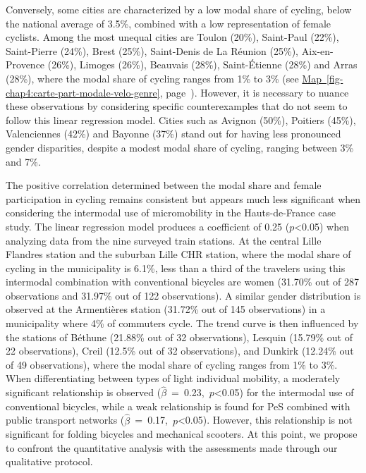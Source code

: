 \begin{refsegment}
Conversely, some cities are characterized by a low modal share of cycling, below the national average of 3.5\%, combined with a low representation of female cyclists. Among the most unequal cities are Toulon (20\%), Saint-Paul (22\%), Saint-Pierre (24\%), Brest (25\%), Saint-Denis de La Réunion (25\%), Aix-en-Provence (26\%), Limoges (26\%), Beauvais (28\%), Saint-Étienne (28\%) and Arras (28\%), where the modal share of cycling ranges from 1\% to 3\% (see \hyperref[fig-chap4:carte-part-modale-velo-genre]{Map~\ref{fig-chap4:carte-part-modale-velo-genre}}, page~\pageref{fig-chap4:carte-part-modale-velo-genre}). However, it is necessary to nuance these observations by considering specific counterexamples that do not seem to follow this linear regression model. Cities such as Avignon (50\%), Poitiers (45\%), Valenciennes (42\%) and Bayonne (37\%) stand out for having less pronounced gender disparities, despite a modest modal share of cycling, ranging between 3\% and 7\%. %

The positive correlation determined between the modal share and female participation in cycling remains consistent but appears much less significant when considering the intermodal use of micromobility in the Hauts-de-France case study. The linear regression model produces a coefficient of 0.25 ($p$\textless0.05) when analyzing data from the nine surveyed train stations. At the central Lille Flandres station and the suburban Lille CHR station, where the modal share of cycling in the municipality is 6.1\%, less than a third of the travelers using this intermodal combination with conventional bicycles are women (31.70\% out of 287 observations and 31.97\% out of 122 observations). A similar gender distribution is observed at the Armentières station (31.72\% out of 145 observations) in a municipality where 4\% of commuters cycle. The trend curve is then influenced by the stations of Béthune (21.88\% out of 32 observations), Lesquin (15.79\% out of 22 observations), Creil (12.5\% out of 32 observations), and Dunkirk (12.24\% out of 49 observations), where the modal share of cycling ranges from 1\% to 3\%. When differentiating between types of light individual mobility, a moderately significant relationship is observed ($\hat{\beta}$~=~0.23,~$p$\textless0.05) for the intermodal use of conventional bicycles, while a weak relationship is found for \acrshort{PeS} combined with public transport networks ($\hat{\beta}$~=~0.17,~$p$\textless0.05). However, this relationship is not significant for folding bicycles and mechanical scooters. At this point, we propose to confront the quantitative analysis with the assessments made through our qualitative protocol. %


\end{refsegment}
